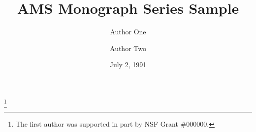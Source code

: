 \documentclass{amsbook}
\theoremstyle{definition}
\theoremstyle{remark}
\numberwithin{section}{chapter}
\numberwithin{equation}{chapter}
\begin{document}
\frontmatter
\title{AMS Monograph Series Sample}

\author{Author One}
\address{Department of Mathematics, Louisiana State University, Baton
Rouge, Louisiana 70803}
\thanks{The first author was supported in part by NSF Grant \#000000.}

\author{Author Two}
\address{Mathematical Research Section, School of Mathematical Sciences,
Australian National University, Canberra ACT 2601, Australia}

\date{July 2, 1991}

\maketitle

\setcounter{page}{4}
\tableofcontents



\mainmatter


\backmatter


\end{document}
